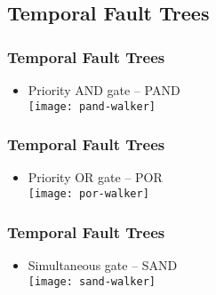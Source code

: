 \subsection{Temporal Fault Trees}

\begin{frame}
\frametitle{Temporal Fault Trees}
\begin{itemize}
  \item Priority AND gate -- PAND\\
  \texttt{[image: pand-walker]}
\end{itemize}
\end{frame}

\begin{frame}
\frametitle{Temporal Fault Trees}
\begin{itemize}
  \item Priority OR gate -- POR\\
  \texttt{[image: por-walker]}
\end{itemize}
\end{frame}

\begin{frame}
\frametitle{Temporal Fault Trees}
\begin{itemize}
  \item Simultaneous gate -- SAND\\
  \texttt{[image: sand-walker]}
\end{itemize}
\end{frame}

